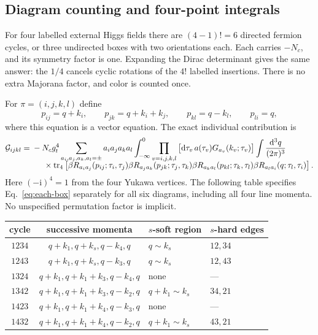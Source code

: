 \documentclass[a4paper,12pt]{article}
\newcommand{\ii}{\mathrm i}
\newcommand{\dd}{\mathrm d}
\newcommand{\tr}{\operatorname{tr}}
\newcommand{\G}{\mathcal G}
\begin{document}
\subsection{Diagram counting and four-point integrals}
For four labelled external Higgs fields there are $(4-1)!=6$ directed fermion
cycles, or three undirected boxes with two orientations each. Each carries
$-N_c$, and its symmetry factor is one. Expanding the Dirac determinant gives the
same answer: the $1/4$ cancels cyclic rotations of the $4!$ labelled insertions.
There is no extra Majorana factor, and color is counted once.

For $\pi=(i,j,k,l)$ define
\begin{equation}
 p_{ij}=q+k_i,\qquad p_{jk}=q+k_i+k_j,\qquad
 p_{kl}=q-k_l,\qquad p_{li}=q,
 \label{eq:routing}
\end{equation}
where this equation is a vector equation. The exact individual contribution is
\begin{align}
 \G_{ijkl}={}&-N_cg_t^4\sum_{a_i,a_j,a_k,a_l=\pm}a_i a_j a_k a_l
 \int_{-\infty}^0\prod_{v=i,j,k,l}\big[\dd\tau_v\,a(\tau_v)G_{a_v}(k_v;\tau_v)\big]
 \int\frac{\dd^3q}{(2\pi)^3}\\[-2mm]
 &\hspace{5mm}\times\tr_4\left[
 \beta R_{a_i a_j}(p_{ij};\tau_i,\tau_j)
 \beta R_{a_j a_k}(p_{jk};\tau_j,\tau_k)
 \beta R_{a_k a_l}(p_{kl};\tau_k,\tau_l)
 \beta R_{a_l a_i}(q;\tau_l,\tau_i)\right].
 \label{eq:each-box}
\end{align}
Here $(-\ii)^4=1$ from the four Yukawa vertices. The following table specifies
Eq.~\eqref{eq:each-box} separately for all six diagrams, including all four line
momenta. No unspecified permutation factor is implicit.
\begin{center}\small
\begin{tabular}{ccll}
\toprule
cycle & successive momenta & $s$-soft region & $s$-hard edges\\\midrule
$1234$ & $q+k_1,q+k_s,q-k_4,q$ & $q\sim k_s$ & $12,34$\\
$1243$ & $q+k_1,q+k_s,q-k_3,q$ & $q\sim k_s$ & $12,43$\\
$1324$ & $q+k_1,q+k_1+k_3,q-k_4,q$ & none & ---\\
$1342$ & $q+k_1,q+k_1+k_3,q-k_2,q$ & $q+k_1\sim k_s$ & $34,21$\\
$1423$ & $q+k_1,q+k_1+k_4,q-k_3,q$ & none & ---\\
$1432$ & $q+k_1,q+k_1+k_4,q-k_2,q$ & $q+k_1\sim k_s$ & $43,21$\\
\bottomrule
\end{tabular}\end{center}
\end{document}
